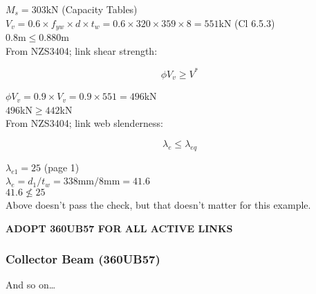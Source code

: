 \documentclass[12pt,a4paper]{article} %
\newcommand{\tab}{\hspace*{2em}} %
\begin{document}
\tab $M_s=303\mathrm{kN}$ (Capacity Tables) \\[8pt]
\tab $V_v=0.6 \times f_{yw} \times d \times t_w = 0.6 \times 320 \times 359 \times 8 = 551$kN (Cl 6.5.3) \\[8pt]
\tab $0.8$m$\leqslant0.880$m  \\

From NZS3404; link shear strength:

\begin{equation*}
\tag{Cl 6.5.3}
\phi V_v \geqslant V^*
\end{equation*}

\tab $\phi V_v=0.9\times V_v=0.9\times551=496$kN \\[8pt]
\tab $496$kN$\geqslant442$kN  \\

From NZS3404; link web slenderness:

\begin{equation}
\tag{Cl 12.8.3}
\lambda_e \leqslant \lambda_{eq}
\end{equation}

\tab $\lambda_{e1}=25$ (page 1) \\[8pt]
\tab $\lambda_e=d_1/t_w=338$mm$/8$mm$=41.6$ \\[8pt]
\tab $41.6 \nleqslant 25$  \\

Above doesn't pass the check, but that doesn't matter for this example.
\par\vspace{\baselineskip}

\begin{center}
\textbf{ADOPT 360UB57 FOR ALL ACTIVE LINKS} \\
\end{center}

\subsubsection{Collector Beam (360UB57)}
And so on\dots

\end{document}
